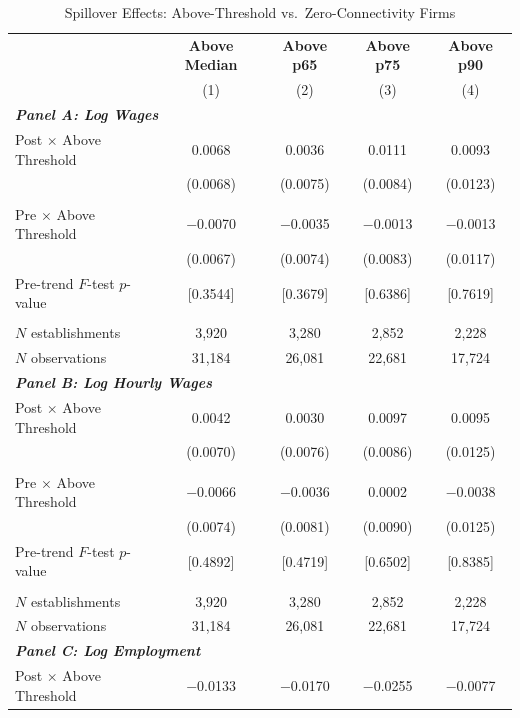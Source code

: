 \begin{table}[!htbp]
\centering
\caption{Spillover Effects: Above-Threshold vs.\ Zero-Connectivity Firms}
\label{tab:conn_margins_thresholds_vs_zero}
\scriptsize
\begin{tabular}{lcccc}
\toprule\toprule
 & \textbf{Above Median} & \textbf{Above p65} & \textbf{Above p75} & \textbf{Above p90} \\
 & (1) & (2) & (3) & (4) \\
\midrule
\multicolumn{5}{l}{\textit{\textbf{Panel A: Log Wages}}} \\
\midrule
Post $\times$ Above Threshold & 0.0068 & 0.0036 & 0.0111 & 0.0093 \\
  & (0.0068) & (0.0075) & (0.0084) & (0.0123) \\
  & & & & \\
Pre $\times$ Above Threshold & $-$0.0070 & $-$0.0035 & $-$0.0013 & $-$0.0013 \\
  & (0.0067) & (0.0074) & (0.0083) & (0.0117) \\
Pre-trend $F$-test $p$-value & [0.3544] & [0.3679] & [0.6386] & [0.7619] \\
  & & & & \\
$N$ establishments & 3,920 & 3,280 & 2,852 & 2,228 \\
$N$ observations & 31,184 & 26,081 & 22,681 & 17,724 \\
\midrule
\multicolumn{5}{l}{\textit{\textbf{Panel B: Log Hourly Wages}}} \\
\midrule
Post $\times$ Above Threshold & 0.0042 & 0.0030 & 0.0097 & 0.0095 \\
  & (0.0070) & (0.0076) & (0.0086) & (0.0125) \\
  & & & & \\
Pre $\times$ Above Threshold & $-$0.0066 & $-$0.0036 & 0.0002 & $-$0.0038 \\
  & (0.0074) & (0.0081) & (0.0090) & (0.0125) \\
Pre-trend $F$-test $p$-value & [0.4892] & [0.4719] & [0.6502] & [0.8385] \\
  & & & & \\
$N$ establishments & 3,920 & 3,280 & 2,852 & 2,228 \\
$N$ observations & 31,184 & 26,081 & 22,681 & 17,724 \\
\midrule
\multicolumn{5}{l}{\textit{\textbf{Panel C: Log Employment}}} \\
\midrule
Post $\times$ Above Threshold & $-$0.0133 & $-$0.0170 & $-$0.0255 & $-$0.0077 \\

\end{tabular}
\end{table}
